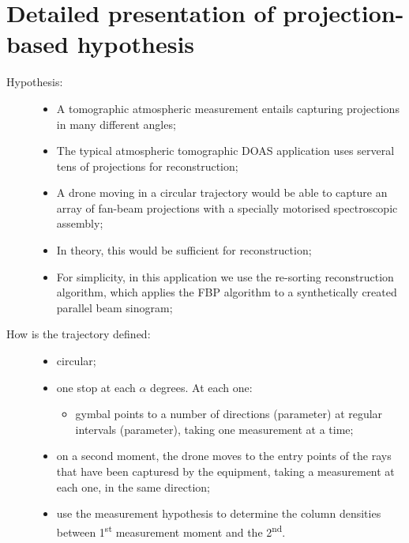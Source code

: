 \section{Detailed presentation of projection-based hypothesis}%
\label{sec:detailed_presentation_of_projection_based_hypothesis}

\begin{description}
    \item[Hypothesis:]
        \begin{itemize}
            \item A tomographic atmospheric measurement entails
                capturing projections in many different angles;
            \item The typical atmospheric tomographic DOAS application
                uses serveral tens of projections for reconstruction;
            \item A drone moving in a circular trajectory would be able
                to capture an array of fan-beam projections with a
                specially motorised spectroscopic assembly;
            \item In theory, this would be sufficient for
                reconstruction;
            \item For simplicity, in this application we use the
                re-sorting reconstruction algorithm, which applies the
                FBP algorithm to a synthetically created parallel beam
                sinogram;
        \end{itemize}
    \item[How is the trajectory defined:\\]
        \begin{itemize}
            \item circular;
            \item one stop at each $\alpha$ degrees. At each one:
                \begin{itemize}
                    \item gymbal points to a number of directions
                        (parameter) at regular intervals (parameter),
                        taking one measurement at a time;
                \end{itemize}
            \item on a second moment, the drone moves to the entry
                points of the rays that have been capturesd by the
                equipment, taking a measurement at each one, in the same
                direction;
            \item use the measurement hypothesis to determine the
                column densities between 1\textsuperscript{st}
                measurement moment and the 2\textsuperscript{nd}.
        \end{itemize}
\end{description}

